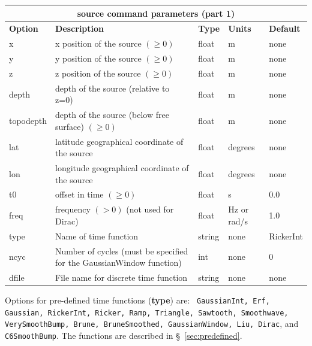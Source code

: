 \documentclass[11pt]{report}
\begin{document}
%
\begin{center}
\begin{tabular}{|l|p{8cm}|l|l|l|} \hline
\multicolumn{5}{|c|}{\bf source command parameters (part 1)}\\ \hline
\bf{Option} & \bf{Description} & \bf{Type} & \bf{Units} & \bf{Default} \\ \hline \hline
x & x position of the source $(\geq 0)$ & float & m & none \\ \hline
y & y position of the source $(\geq 0)$ & float & m & none \\ \hline
z & z position of the source $(\geq 0)$ & float & m & none \\ \hline
\hline
depth & depth of the source (relative to z=0) & float & m & none \\ \hline
topodepth & depth of the source (below free surface) $(\geq 0)$ & float & m & none \\ \hline
lat & latitude geographical coordinate of the source & float & degrees & none \\ \hline
lon & longitude geographical coordinate of the source & float & degrees & none \\ \hline
\hline
t0 & offset in time $(\geq 0)$ & float & s & 0.0 \\ \hline
freq & frequency $(>0)$ (not used for Dirac)& float & Hz or rad/s & 1.0 \\ \hline
type & Name of time function & string & none & RickerInt \\ \hline
ncyc & Number of cycles (must be specified for the GaussianWindow function) & int & none & 0
\\ \hline
dfile & File name for discrete time function & string & none & none \\ \hline
\end{tabular}
\end{center}
  Options for pre-defined time functions ({\bf type}) are: {\tt
  GaussianInt, Erf, Gaussian, RickerInt, Ricker, Ramp, Triangle, Sawtooth, Smoothwave,
  VerySmoothBump, Brune, BruneSmoothed, GaussianWindow, Liu, Dirac}, and {\tt C6SmoothBump}. The
functions are described in \S~\ref{sec:predefined}.  
\end{document}
